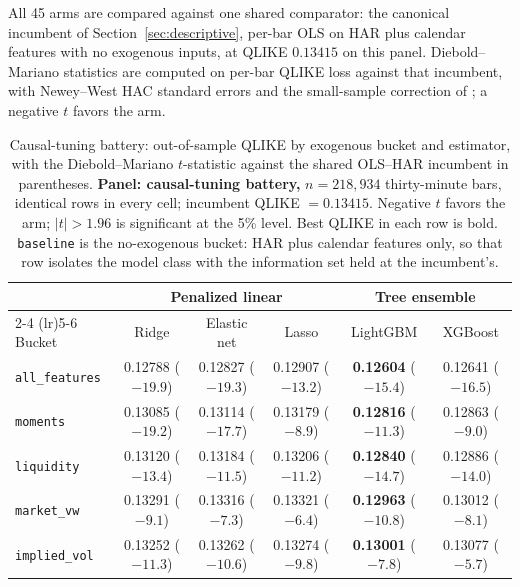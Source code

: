 All 45 arms are compared against one shared comparator: the canonical incumbent
of Section~\ref{sec:descriptive}, per-bar OLS on HAR plus calendar features with
no exogenous inputs, at QLIKE $0.13415$ on this panel. Diebold--Mariano
statistics \citep{DieboldMariano1995} are computed on per-bar QLIKE loss
\citep{Patton2011} against that incumbent, with Newey--West HAC standard errors
and the small-sample correction of \citet{HarveyLeybourneNewbold1997}; a negative
$t$ favors the arm.

\begin{table}[H]
\centering
\small
\setlength{\tabcolsep}{4pt}
\caption{Causal-tuning battery: out-of-sample QLIKE by exogenous bucket and
estimator, with the Diebold--Mariano $t$-statistic against the shared OLS--HAR
incumbent in parentheses. \textbf{Panel: causal-tuning battery,}
$n = 218{,}934$ thirty-minute bars, identical rows in every cell; incumbent QLIKE
$= 0.13415$. Negative $t$ favors the arm; $|t| > 1.96$ is significant at the
5\% level. Best QLIKE in each row is bold. \texttt{baseline} is the no-exogenous
bucket: HAR plus calendar features only, so that row isolates the model class
with the information set held at the incumbent's.}
\label{tab:battery_bucket_estimator}
\begin{tabular}{@{}lccccc@{}}
\toprule
& \multicolumn{3}{c}{Penalized linear} & \multicolumn{2}{c}{Tree ensemble} \\
\cmidrule(lr){2-4} \cmidrule(lr){5-6}
Bucket & Ridge & Elastic net & Lasso & LightGBM & XGBoost \\
\midrule
\texttt{all\_features} & 0.12788 ($-19.9$) & 0.12827 ($-19.3$) & 0.12907 ($-13.2$) & \textbf{0.12604} ($-15.4$) & 0.12641 ($-16.5$) \\
\texttt{moments}       & 0.13085 ($-19.2$) & 0.13114 ($-17.7$) & 0.13179 ($-8.9$)  & \textbf{0.12816} ($-11.3$) & 0.12863 ($-9.0$) \\
\texttt{liquidity}     & 0.13120 ($-13.4$) & 0.13184 ($-11.5$) & 0.13206 ($-11.2$) & \textbf{0.12840} ($-14.7$) & 0.12886 ($-14.0$) \\
\texttt{market\_vw}    & 0.13291 ($-9.1$)  & 0.13316 ($-7.3$)  & 0.13321 ($-6.4$)  & \textbf{0.12963} ($-10.8$) & 0.13012 ($-8.1$) \\
\texttt{implied\_vol}  & 0.13252 ($-11.3$) & 0.13262 ($-10.6$) & 0.13274 ($-9.8$)  & \textbf{0.13001} ($-7.8$)  & 0.13077 ($-5.7$) \\

\end{tabular}
\end{table}
